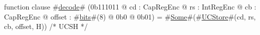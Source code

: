 function clause #\hyperref[zdecode]{decode}# (0b111011 @ cd : CapRegEnc @ rs : IntRegEnc @ cb : CapRegEnc @ offset : #\hyperref[zbits]{bits}#(8) @ 0b0 @ 0b01) = #\hyperref[zSome]{Some}#(#\hyperref[zUCStore]{UCStore}#(cd, rs, cb, offset, H)) /* UCSH */
